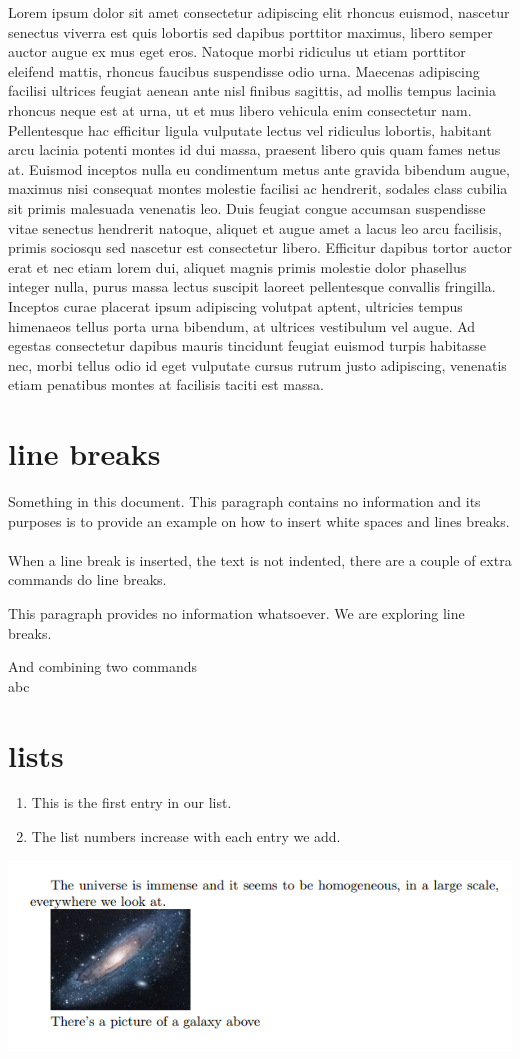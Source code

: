 \documentclass[12pt, letterpaper]{article}
\begin{document}
Lorem ipsum dolor sit amet consectetur adipiscing elit rhoncus euismod, nascetur senectus viverra est quis lobortis sed dapibus porttitor maximus, libero semper auctor augue ex mus eget eros. Natoque morbi ridiculus ut etiam porttitor eleifend mattis, rhoncus faucibus suspendisse odio urna. Maecenas adipiscing facilisi ultrices feugiat aenean ante nisl finibus sagittis, ad mollis tempus lacinia rhoncus neque est at urna, ut et mus libero vehicula enim consectetur nam. Pellentesque hac efficitur ligula vulputate lectus vel ridiculus lobortis, habitant arcu lacinia potenti montes id dui massa, praesent libero quis quam fames netus at. Euismod inceptos nulla eu condimentum metus ante gravida bibendum augue, maximus nisi consequat montes molestie facilisi ac hendrerit, sodales class cubilia sit primis malesuada venenatis leo. Duis feugiat congue accumsan suspendisse vitae senectus hendrerit natoque, aliquet et augue amet a lacus leo arcu facilisis, primis sociosqu sed nascetur est consectetur libero. Efficitur dapibus tortor auctor erat et nec etiam lorem dui, aliquet magnis primis molestie dolor phasellus integer nulla, purus massa lectus suscipit laoreet pellentesque convallis fringilla. Inceptos curae placerat ipsum adipiscing volutpat aptent, ultricies tempus himenaeos tellus porta urna bibendum, at ultrices vestibulum vel augue. Ad egestas consectetur dapibus mauris tincidunt feugiat euismod turpis habitasse nec, morbi tellus odio id eget vulputate cursus rutrum justo adipiscing, venenatis etiam penatibus montes at facilisis taciti est massa.

\pagebreak
\section{line breaks}

Something in this document. This paragraph contains no information 
and its purposes is to provide an example on how to insert white 
spaces and lines breaks.\\
\\
When a line break is inserted, the text is not indented, there 
are a couple of extra commands do line breaks. \newline

This paragraph provides no information whatsoever. We are exploring 
line breaks. \hfill \break

And combining two commands\\

abc
\pagebreak
\section{lists}
\begin{enumerate}
    \item This is the first entry in our list.
    \item The list numbers increase with each entry we add.
\end{enumerate}

\includegraphics[width=\textwidth]{universe}
\end{document}
